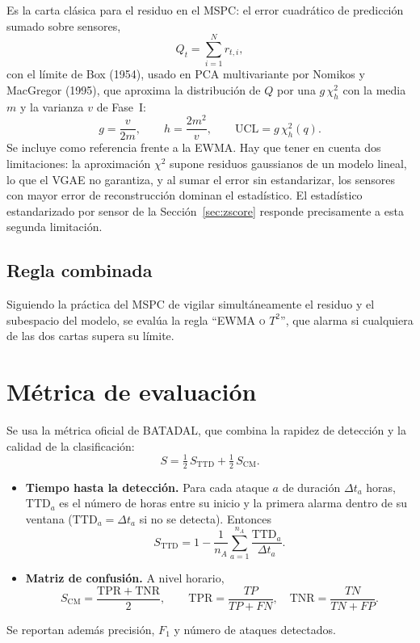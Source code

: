 \documentclass[11pt,a4paper]{article}
\newcommand{\UCL}{\mathrm{UCL}}
\begin{document}
Es la carta clásica para el residuo en el MSPC: el error cuadrático de predicción
sumado sobre sensores,
\begin{equation}
Q_t=\sum_{i=1}^{N} r_{t,i},
\end{equation}
con el límite de Box (1954), usado en PCA multivariante por Nomikos y MacGregor (1995),
que aproxima la distribución de $Q$ por una $g\,\chi^2_h$ con la media $m$ y la
varianza $v$ de Fase~I:
\begin{equation}
g=\frac{v}{2m},\qquad h=\frac{2m^2}{v},\qquad \UCL=g\,\chi^2_{h}(q).
\end{equation}
Se incluye como referencia frente a la EWMA. Hay que tener en cuenta dos
limitaciones: la aproximación $\chi^2$ supone residuos gaussianos de un modelo
lineal, lo que el VGAE no garantiza, y al sumar el error sin estandarizar, los
sensores con mayor error de reconstrucción dominan el estadístico. El estadístico
estandarizado por sensor de la Sección~\ref{sec:zscore} responde precisamente a esta
segunda limitación.

\subsection{Regla combinada}

Siguiendo la práctica del MSPC de vigilar simultáneamente el residuo y el subespacio
del modelo, se evalúa la regla ``EWMA \textsc{o} $T^2$'', que alarma si cualquiera de
las dos cartas supera su límite.

\section{Métrica de evaluación}

Se usa la métrica oficial de BATADAL, que combina la rapidez de detección y la
calidad de la clasificación:
\begin{equation}
S=\tfrac12\,S_{\mathrm{TTD}}+\tfrac12\,S_{\mathrm{CM}}.
\end{equation}
\begin{itemize}
\item \textbf{Tiempo hasta la detección.} Para cada ataque $a$ de duración
  $\Delta t_a$ horas, $\mathrm{TTD}_a$ es el número de horas entre su inicio y la
  primera alarma dentro de su ventana ($\mathrm{TTD}_a=\Delta t_a$ si no se
  detecta). Entonces
  \begin{equation}
  S_{\mathrm{TTD}}=1-\frac1{n_A}\sum_{a=1}^{n_A}\frac{\mathrm{TTD}_a}{\Delta t_a}.
  \end{equation}
\item \textbf{Matriz de confusión.} A nivel horario,
  \begin{equation}
  S_{\mathrm{CM}}=\frac{\mathrm{TPR}+\mathrm{TNR}}{2},\qquad
  \mathrm{TPR}=\frac{TP}{TP+FN},\quad \mathrm{TNR}=\frac{TN}{TN+FP}.
  \end{equation}
\end{itemize}
Se reportan además precisión, $F_1$ y número de ataques detectados.
\end{document}

